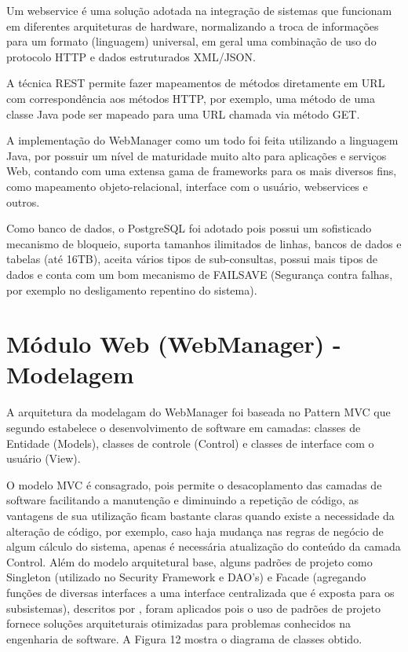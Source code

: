 Um webservice é uma solução adotada na integração de sistemas que funcionam em diferentes arquiteturas de hardware, normalizando a troca de informações para um formato (linguagem) universal, em geral uma combinação de uso do protocolo HTTP e dados estruturados XML/JSON. 

A técnica REST permite fazer mapeamentos de métodos diretamente em URL com correspondência aos métodos HTTP, por exemplo, uma método de uma classe Java pode ser mapeado para uma URL chamada via método GET.

A implementação do WebManager como um todo foi feita utilizando a linguagem Java, por possuir um nível de maturidade muito alto para aplicações e serviços Web, contando com uma extensa gama de frameworks para os mais diversos fins, como mapeamento objeto-relacional, interface com o usuário,  webservices e outros.

Como banco de dados, o PostgreSQL foi adotado  pois possui um sofisticado mecanismo de bloqueio, suporta tamanhos ilimitados de linhas, bancos de dados e tabelas (até 16TB), aceita vários tipos de sub-consultas, possui mais tipos de dados e conta com um bom mecanismo de FAILSAVE (Segurança contra falhas, por exemplo no desligamento repentino do sistema).

\section{Módulo Web (WebManager) - Modelagem}

A arquitetura da modelagam do WebManager foi baseada no Pattern MVC que segundo \textcite{Mendes:2002} estabelece o desenvolvimento de software em camadas: classes de Entidade (Models), classes de controle (Control) e classes de interface com o usuário (View). 

O modelo MVC é consagrado, pois permite o desacoplamento das camadas de software facilitando a manutenção e diminuindo a repetição de código, as vantagens de sua utilização ficam bastante claras quando existe a necessidade da alteração de código, por exemplo, caso haja mudança nas regras de negócio de algum cálculo do sistema, apenas é necessária atualização do conteúdo da camada Control. Além do modelo arquitetural base, alguns padrões de projeto como Singleton (utilizado no Security Framework e DAO's) e Facade (agregando funções de diversas interfaces a uma interface centralizada que é exposta para os subsistemas), descritos por \textcite{Gamma:2000}, foram aplicados pois o uso de padrões de projeto fornece soluções arquiteturais otimizadas para problemas conhecidos na engenharia de software. A Figura 12 mostra o diagrama de classes obtido.

